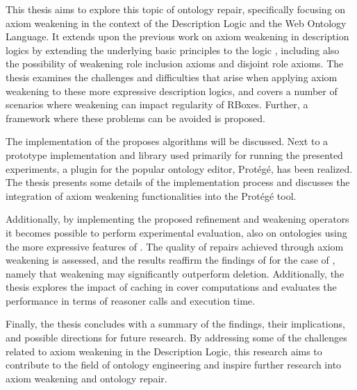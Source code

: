 This thesis aims to explore this topic of ontology repair, specifically focusing on axiom weakening in the context of the \SROIQ Description Logic and the Web Ontology Language. It extends upon the previous work on axiom weakening in description logics by extending the underlying basic principles to the logic \SROIQ, including also the possibility of weakening role inclusion axioms and disjoint role axioms. The thesis examines the challenges and difficulties that arise when applying axiom weakening to these more expressive description logics, and covers a number of scenarios where weakening can impact regularity of \SROIQ RBoxes. Further, a framework where these problems can be avoided is proposed.

The implementation of the proposes algorithms will be discussed. Next to a prototype implementation and library used primarily for running the presented experiments, a plugin for the popular ontology editor, Protégé, has been realized. The thesis presents some details of the implementation process and discusses the integration of axiom weakening functionalities into the Protégé tool.

Additionally, by implementing the proposed refinement and weakening operators it becomes possible to perform experimental evaluation, also on ontologies using the more expressive features of \SROIQ. The quality of repairs achieved through axiom weakening is assessed, and the results reaffirm the findings of \cite{troquard2018repairing} for the case of \SROIQ, namely that weakening may significantly outperform deletion. Additionally, the thesis explores the impact of caching in cover computations and evaluates the performance in terms of reasoner calls and execution time.

Finally, the thesis concludes with a summary of the findings, their implications, and possible directions for future research. By addressing some of the challenges related to axiom weakening in the \SROIQ Description Logic, this research aims to contribute to the field of ontology engineering and inspire further research into axiom weakening and ontology repair.

